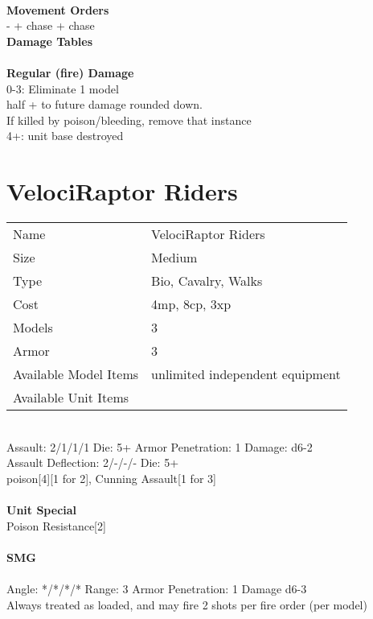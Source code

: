\ \\ {\bf Movement Orders } \\
- + chase + chase \\



{\bf Damage Tables} \\
\ \\ {\bf Regular (fire) Damage } \\
0-3: Eliminate 1 model\\ half + to future damage rounded down. \\ If killed by poison/bleeding, remove that instance \\
4+: unit base destroyed \\









\pagebreak

\section{ VelociRaptor Riders }

\begin{tabular}{ll}
  Name & VelociRaptor Riders \\
  Size & Medium\\
  Type & Bio, Cavalry, Walks\\
  Cost & 4mp, 8cp, 3xp\\
  Models & 3\\
  Armor & 3\\
  Available Model Items & unlimited independent equipment \\
  Available Unit Items &  \\
\end{tabular}

\ \\
Assault: 2/1/1/1 Die: 5+ Armor Penetration: 1 Damage: d6-2 \\
Assault Deflection: 2/-/-/- Die: 5+\\
\indent poison[4][1 for 2], Cunning Assault[1 for 3] \\
\ \\

{\bf Unit Special} \\
Poison Resistance[2]
\ \\
\ \\
{\bf SMG } \\
\ \\
Angle: */*/*/* Range: 3 Armor Penetration: 1 Damage d6-3 \\
\indent Always treated as loaded, and may fire 2 shots per fire order (per model) \\



